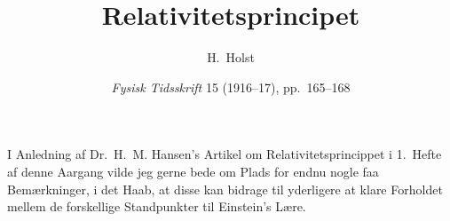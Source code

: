 \documentclass[12pt,a4paper]{article}
\title{\textbf{\guillemotleft Relativitetsprincipet\guillemotright}}
\author{H.\ Holst}
\date{\textit{Fysisk Tidsskrift} 15 (1916--17), pp.~165--168}
\newcommand{\opage}[1]{\marginnote{\footnotesize\textit{[#1]}}}
\begin{document}
\maketitle

\opage{165} %
I Anledning af Dr.~H.~M. Hansen's Artikel om Relativitetsprincippet i
1.~Hefte af denne Aargang vilde jeg gerne bede om Plads for endnu nogle faa
Bemærkninger, i det Haab, at disse kan bidrage til yderligere at klare
Forholdet mellem de forskellige Standpunkter til Einstein's Lære.
\end{document}
